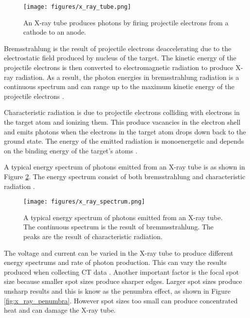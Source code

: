 \begin{figure}
	\centering
	\texttt{[image: figures/x\_ray\_tube.png]}
	\caption{An X-ray tube produces photons by firing projectile electrons from a cathode to an anode. \citep{michael2001x}}
	\label{fig:x_ray_tube}
\end{figure}

Bremsstrahlung is the result of projectile electrons deaccelerating due to the electrostatic field produced by nucleus of the target. The kinetic energy of the projectile electrons is then converted to electromagnetic radiation to produce X-ray radiation. As a result, the photon energies in bremsstrahlung radiation is  a continuous spectrum and can range up to the maximum kinetic energy of the projectile electrons \citep{michael2001x}.

Characteristic radiation is due to projectile electrons colliding with electrons in the target atom and ionizing them. This produce vacancies in the electron shell and emits photons when the electrons in the target atom drops down back to the ground state. The energy of the emitted radiation is monoenergetic and depends on the binding energy of the target's atoms \citep{michael2001x}.

A typical energy spectrum of photons emitted from an X-ray tube is as shown in Figure \ref{fig:x_ray_spectrum}. The energy spectrum consist of both bremsstrahlung and characteristic radiation \citep{michael2001x}.

\begin{figure}
	\centering
	\texttt{[image: figures/x\_ray\_spectrum.png]}
	\caption{A typical energy spectrum of photons emitted from an X-ray tube. The continuous spectrum is the result of bremmsstrahlung. The peaks are the result of characteristic radiation. \citep{michael2001x}}
	\label{fig:x_ray_spectrum}
\end{figure}

The voltage and current can be varied in the X-ray tube to produce different energy spectrums and rate of photon production. This can vary the results produced when collecting CT data \citep{cantatore2011introduction}. Another important factor is the focal spot size because smaller spot sizes produce sharper edges. Larger spot sizes produce unsharp results and this is know as the penumbra effect, as shown in Figure \ref{fig:x_ray_penumbra}. However spot sizes too small can produce concentrated heat \citep{welkenhuyzen2009industrial} and can damage the X-ray tube.

